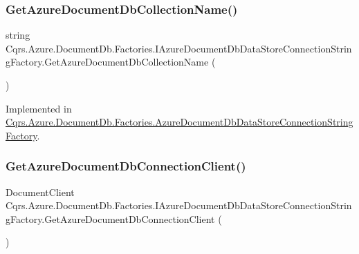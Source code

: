 \subsubsection{\texorpdfstring{Get\+Azure\+Document\+Db\+Collection\+Name()}{GetAzureDocumentDbCollectionName()}}
{\footnotesize\ttfamily string Cqrs.\+Azure.\+Document\+Db.\+Factories.\+I\+Azure\+Document\+Db\+Data\+Store\+Connection\+String\+Factory.\+Get\+Azure\+Document\+Db\+Collection\+Name (\begin{DoxyParamCaption}{ }\end{DoxyParamCaption})}



Implemented in \hyperlink{classCqrs_1_1Azure_1_1DocumentDb_1_1Factories_1_1AzureDocumentDbDataStoreConnectionStringFactory_a0685593d04e9a905d270800c278ddb42_a0685593d04e9a905d270800c278ddb42}{Cqrs.\+Azure.\+Document\+Db.\+Factories.\+Azure\+Document\+Db\+Data\+Store\+Connection\+String\+Factory}.

\mbox{\label{interfaceCqrs_1_1Azure_1_1DocumentDb_1_1Factories_1_1IAzureDocumentDbDataStoreConnectionStringFactory_ad5207c6dfcb6496aa9fb731b6453a1ee_ad5207c6dfcb6496aa9fb731b6453a1ee}} 
\subsubsection{\texorpdfstring{Get\+Azure\+Document\+Db\+Connection\+Client()}{GetAzureDocumentDbConnectionClient()}}
{\footnotesize\ttfamily Document\+Client Cqrs.\+Azure.\+Document\+Db.\+Factories.\+I\+Azure\+Document\+Db\+Data\+Store\+Connection\+String\+Factory.\+Get\+Azure\+Document\+Db\+Connection\+Client (\begin{DoxyParamCaption}{ }\end{DoxyParamCaption})}




